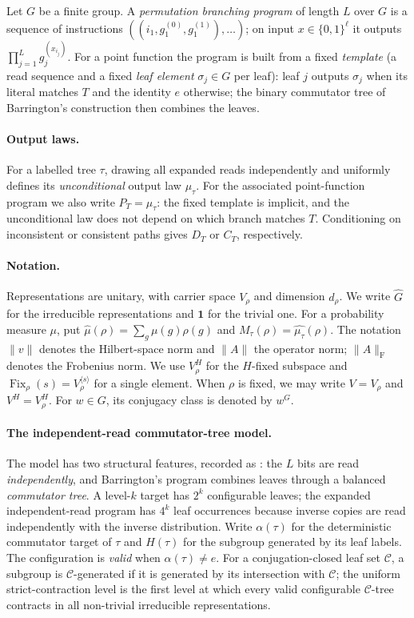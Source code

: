 \documentclass[11pt]{amsart}
\theoremstyle{definition}
\theoremstyle{remark}
\theoremstyle{plain}
\theoremstyle{plain}
\numberwithin{equation}{section}
\DeclareMathOperator{\Fix}{Fix}
\newcommand{\norm}[1]{\lVert #1 \rVert}
\newcommand{\frob}[1]{\norm{#1}_{\mathrm{F}}}
\begin{document}
Let $G$ be a finite group. A \emph{permutation branching program} of length $L$ over
$G$ is a sequence of instructions $((i_1,g_1^{(0)},g_1^{(1)}),\dots)$; on input
$x\in\{0,1\}^\ell$ it outputs $\prod_{j=1}^L g_j^{(x_{i_j})}$. For a point function the
program is built from a fixed \emph{template} (a read sequence and a fixed
\emph{leaf element} $\sigma_j\in G$ per leaf): leaf $j$ outputs $\sigma_j$ when its
literal matches $T$ and the identity $e$ otherwise; the binary commutator tree of
Barrington's construction then combines the leaves.

\paragraph{Output laws.}
For a labelled tree $\tau$, drawing all expanded reads independently and
uniformly defines its \emph{unconditional} output law $\mu_\tau$.
For the associated point-function program we also write $P_T=\mu_\tau$:
the fixed template is implicit, and the unconditional law does not depend
on which branch matches $T$. Conditioning on inconsistent or consistent
paths gives $D_T$ or $C_T$, respectively.

\paragraph{Notation.}
Representations are unitary, with carrier space $V_\rho$ and dimension
$d_\rho$. We write $\widehat G$ for the irreducible representations and
$\mathbf1$ for the trivial one. For a probability measure $\mu$, put
$\widehat\mu(\rho)=\sum_g\mu(g)\rho(g)$ and
$M_\tau(\rho)=\widehat{\mu_\tau}(\rho)$.
The notation $\norm v$ denotes the Hilbert-space norm and $\norm A$ the
operator norm; $\frob A$ denotes the Frobenius norm.
We use $V_\rho^H$ for the $H$-fixed subspace and
$\Fix_\rho(s)=V_\rho^{\langle s\rangle}$ for a single element.
When $\rho$ is fixed, we may write $V=V_\rho$ and $V^H=V_\rho^H$.
For $w\in G$, its conjugacy class is denoted by $w^G$.

\paragraph{The independent-read commutator-tree model.}
The model has two structural features, recorded as : the
$L$ bits are read \emph{independently}, and Barrington's program combines leaves through a
balanced \emph{commutator tree}. A level-$k$ target has $2^k$ configurable leaves; the expanded
independent-read program has $4^k$ leaf occurrences because inverse copies are read independently
with the inverse distribution. Write $\alpha(\tau)$ for the deterministic
commutator target of $\tau$ and $H(\tau)$ for the subgroup generated by its
leaf labels. The configuration is \emph{valid} when $\alpha(\tau)\ne e$.
For a conjugation-closed leaf set $\mathcal C$, a subgroup is $\mathcal C$-generated if it is
generated by its intersection with $\mathcal C$; the uniform strict-contraction level is the first
level at which every valid configurable $\mathcal C$-tree contracts in all non-trivial irreducible
representations.
\end{document}
